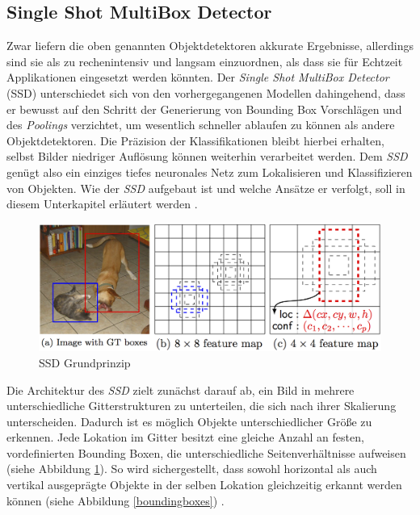 \subsection{Single Shot MultiBox Detector}

Zwar liefern die oben genannten Objektdetektoren akkurate Ergebnisse, allerdings sind sie als zu rechenintensiv und langsam einzuordnen, als dass sie für Echtzeit Applikationen eingesetzt werden könnten. Der \textit{Single Shot MultiBox Detector} (SSD) unterschiedet sich von den vorhergegangenen Modellen dahingehend, dass er bewusst auf den Schritt der Generierung von Bounding Box Vorschlägen und des \textit{Poolings} verzichtet, um wesentlich schneller ablaufen zu können als andere Objektdetektoren. Die Präzision der Klassifikationen bleibt hierbei erhalten, selbst Bilder niedriger Auflösung können weiterhin verarbeitet werden. Dem \textit{SSD} genügt also ein einziges tiefes neuronales Netz zum Lokalisieren und Klassifizieren von Objekten. Wie der \textit{SSD} aufgebaut ist und welche Ansätze er verfolgt, soll in diesem Unterkapitel erläutert werden \cite{ssd.20161229}. 

\begin{figure}[ht]
	\begin{center}
		\includegraphics[width=15cm]{Bilder/ssd_framework.png} 
		\caption[SSD Grundprinzip]{SSD Grundprinzip \cite{ssd.20161229}}
		\label{framework}
	\end{center}
\end{figure}

Die Architektur des \textit{SSD} zielt zunächst darauf ab, ein Bild in mehrere unterschiedliche Gitterstrukturen zu unterteilen, die sich nach ihrer Skalierung unterscheiden. Dadurch ist es möglich Objekte unterschiedlicher Größe zu erkennen. Jede Lokation im Gitter besitzt eine gleiche Anzahl an festen, vordefinierten Bounding Boxen, die unterschiedliche Seitenverhältnisse aufweisen (siehe Abbildung \ref{framework}). So wird sichergestellt, dass sowohl horizontal als auch vertikal ausgeprägte Objekte in der selben Lokation gleichzeitig erkannt werden können (siehe Abbildung \ref{boundingboxes}) \cite{ssd.20161229}.


